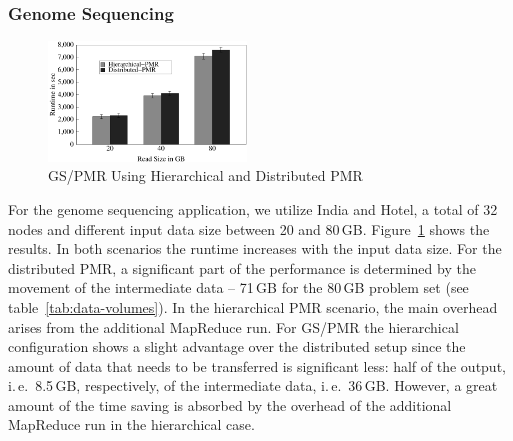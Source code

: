 \documentclass{acm_proc_article-sp}
\newcommand{\pnote}[1]{ {\textcolor{magenta} { ***pradeep: #1 }}}
\newcommand{\pnote}[1]{}
\begin{document}
\subsubsection*{Genome Sequencing}



\begin{figure}[ht]
	\centering
		\includegraphics[width=0.47\textwidth]{figures/gs_hihmr_dpmr.pdf}
\caption{GS/PMR Using Hierarchical and Distributed PMR} 	
\label{fig:gs_hihmr_dpmr}
\end{figure}		

For the genome sequencing application, we utilize India and Hotel, a total of 32
nodes and different input data size between 20 and 80\,GB.
Figure~\ref{fig:gs_hihmr_dpmr} shows the results. In both scenarios the runtime
increases with the input data size. For the distributed PMR, a significant part
of the performance is determined by the movement of the intermediate data --
71\,GB for the 80\,GB problem set (see table~\ref{tab:data-volumes}). In the
hierarchical PMR scenario, the main overhead arises from the additional
MapReduce run. For GS/PMR the hierarchical configuration shows a slight
advantage over the distributed setup since the amount of data that needs to be
transferred is significant less: half of the output, i.\,e.\ 8.5\,GB,
respectively, of the intermediate data, i.\,e.\ 36\,GB. However, a great amount 
of the time saving is absorbed by the overhead of the additional MapReduce run 
in the hierarchical case.
\end{document}
